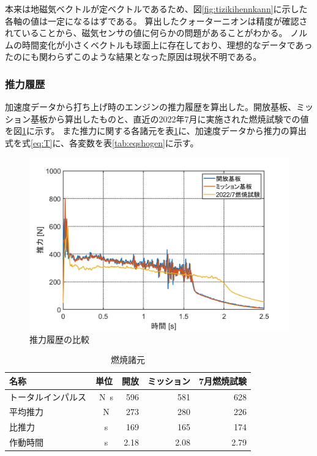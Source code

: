 \documentclass[a4paper,11pt,titlepage,uplatex]{jsarticle}
\begin{document}
本来は地磁気ベクトルが定ベクトルであるため、図\ref{fig:tizikihennkann}に示した各軸の値は一定になるはずである。
算出したクォーターニオンは精度が確認されていることから、磁気センサの値に何らかの問題があることがわかる。
ノルムの時間変化が小さくベクトルも球面上に存在しており、理想的なデータであったのにも関わらずこのような結果となった原因は現状不明である。


\subsubsection{推力履歴}
\label{suiryokurireki}
加速度データから打ち上げ時のエンジンの推力履歴を算出した。開放基板、ミッション基板から算出したものと、直近の2022年7月に実施された燃焼試験での値を図\ref{fig:suiryokurireki}に示す。
また推力に関する各諸元を表\ref{tab:nenshoushogen}に、加速度データから推力の算出式を式\eqref{eq:T}に、各変数を表\ref{tab:eqshogen}に示す。

\begin{figure}[H]
    \centering
    \includegraphics[width=0.7\linewidth]{pic_sim/acc_thrust.png}
    \caption{推力履歴の比較}
    \label{fig:suiryokurireki}
\end{figure}



\begin{table}[H]
    \centering
    \caption{燃焼諸元}
    \label{tab:nenshoushogen}
    \begin{tabular}{lcrrr}
        \hline
        名称        & 単位         & \multicolumn{1}{c}{開放} & \multicolumn{1}{c}{ミッション} & \multicolumn{1}{c}{7月燃焼試験} \\
        \hline
        トータルインパルス & \SI{}{N.s} & 596                    & 581                       & 628                        \\
        平均推力      & \SI{}{N}   & 273                    & 280                       & 226                        \\
        比推力       & \SI{}{s}   & 169                    & 165                       & 174                        \\
        作動時間      & \SI{}{s}   & 2.18                   & 2.08                      & 2.79                       \\
        \hline
    \end{tabular}
\end{table}
\end{document}
